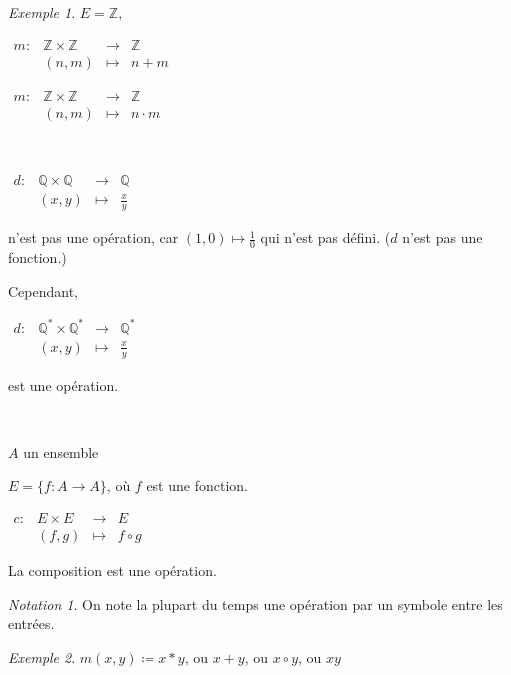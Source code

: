 \documentclass{report}
\theoremstyle{definition}
\theoremstyle{remark}
\newtheorem*{exem}{Exemple}
\newtheorem*{nota}{Notation}
\begin{document}
	\begin{exem}
		$E=\mathbb{Z}$,

		$\begin{array}{rrcl}
			m:&\mathbb{Z} \times \mathbb{Z} &\longrightarrow& \mathbb{Z}\\
			&(n,m)&\longmapsto&n + m
		\end{array}$

		$\begin{array}{rrcl}
			m:&\mathbb{Z} \times \mathbb{Z} &\longrightarrow& \mathbb{Z}\\
			&(n,m)&\longmapsto&n \cdot m
		\end{array}$

		~

		$\begin{array}{rrcl}
			d:&\mathbb{Q} \times \mathbb{Q}&\longrightarrow&\mathbb{Q}\\
			&(x,y)&\longmapsto&\frac{x}{y}
		\end{array}$

		n'est pas une op\'eration, car $(1,0) \mapsto \frac{1}{0}$ qui n'est pas d\'efini. ($d$ n'est pas une fonction.)

		Cependant,

		$\begin{array}{rrcl}
			d:&\mathbb{Q}^* \times \mathbb{Q}^*&\longrightarrow&\mathbb{Q}^*\\
			&(x,y)&\longmapsto&\frac{x}{y}
		\end{array}$

		est une op\'eration.

		~

		$A$ un ensemble

		$E=\{f:A \to A\}$, o\`u $f$ est une fonction.

		$\begin{array}{rrcl}
			c:&E \times E&\longrightarrow&E\\
			&(f,g)&\longmapsto&f \circ g
		\end{array}$

		La composition est une op\'eration.
	\end{exem}

	\begin{nota}
		On note la plupart du temps une op\'eration par un symbole entre les entr\'ees.
	\end{nota}

	\begin{exem}
		$m(x,y) \coloneq x*y$, ou $x+y$, ou $x \circ y$, ou $xy$
	\end{exem}
\end{document}
